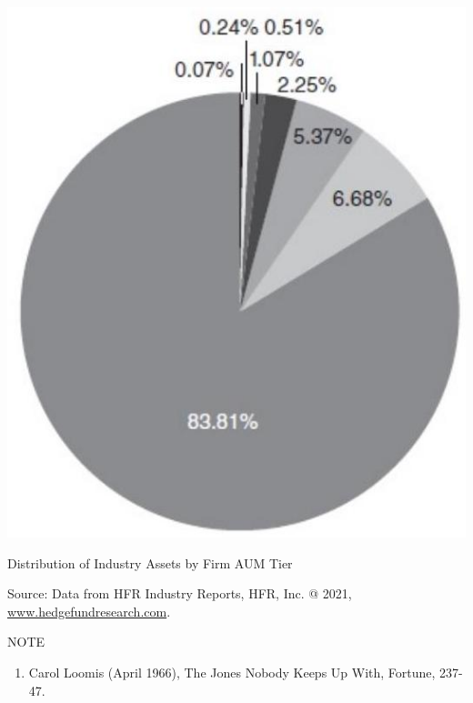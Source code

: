 \documentclass[11pt]{article}
\begin{document}
\begin{center}
\includegraphics[max width=\textwidth]{2024_04_09_501764bcdced134762e2g-3}
\end{center}

Distribution of Industry Assets by Firm AUM Tier

Source: Data from HFR Industry Reports, HFR, Inc. @ 2021, \href{http://www.hedgefundresearch.com}{www.hedgefundresearch.com}.

NOTE

\begin{enumerate}
  \item Carol Loomis (April 1966), The Jones Nobody Keeps Up With, Fortune, 237-47.
\end{enumerate}
\end{document}
